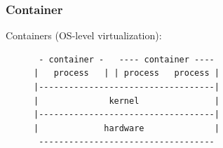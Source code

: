 \documentclass{beamer}
\begin{document}
\begin{frame}[fragile]
    \frametitle{Container}
    Containers (OS-level virtualization):
    \begin{figure}
        \centering
        \begin{varwidth}{\linewidth}
            \begin{verbatim}
 - container -   ---- container ----
|   process   | | process   process |
|-----------------------------------|
|              kernel               |
|-----------------------------------|
|             hardware              |
 -----------------------------------
            \end{verbatim}
        \end{varwidth}
    \end{figure}
\end{frame}
\end{document}
